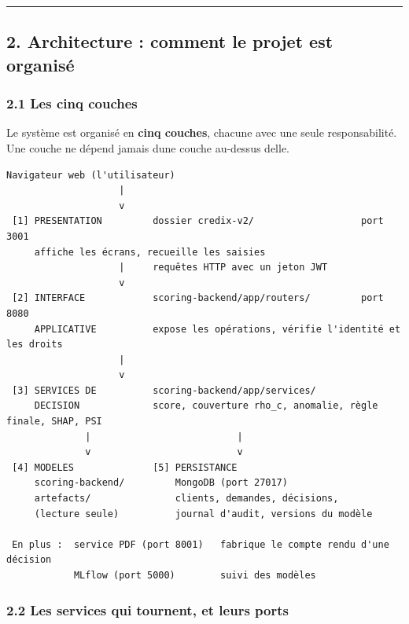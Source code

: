 \documentclass[
  french,
  11pt,
  a4paper,
]{article}
\begin{document}
\begin{center}\rule{0.5\linewidth}{0.5pt}\end{center}

\subsection{2. Architecture : comment le projet est
organisé}\label{2-architecture--comment-le-projet-est-organisuxe9}

\subsubsection{2.1 Les cinq couches}\label{21-les-cinq-couches}

Le système est organisé en \textbf{cinq couches}, chacune avec une seule
responsabilité. Une couche ne dépend jamais d\textquotesingle une couche
au-dessus d\textquotesingle elle.

\begin{Verbatim}[breaklines=true,breakanywhere=true,fontsize=\small,frame=leftline,framerule=1.6pt,rulecolor=\color{credixblue},framesep=3mm,xleftmargin=2mm,xrightmargin=1mm]
        Navigateur web (l'utilisateur)
                    |
                    v
 [1] PRESENTATION         dossier credix-v2/                   port 3001
     affiche les écrans, recueille les saisies
                    |     requêtes HTTP avec un jeton JWT
                    v
 [2] INTERFACE            scoring-backend/app/routers/         port 8080
     APPLICATIVE          expose les opérations, vérifie l'identité et les droits
                    |
                    v
 [3] SERVICES DE          scoring-backend/app/services/
     DECISION             score, couverture rho_c, anomalie, règle finale, SHAP, PSI
              |                          |
              v                          v
 [4] MODELES              [5] PERSISTANCE
     scoring-backend/         MongoDB (port 27017)
     artefacts/               clients, demandes, décisions,
     (lecture seule)          journal d'audit, versions du modèle

 En plus :  service PDF (port 8001)   fabrique le compte rendu d'une décision
            MLflow (port 5000)        suivi des modèles
\end{Verbatim}

\subsubsection{2.2 Les services qui tournent, et leurs
ports}\label{22-les-services-qui-tournent-et-leurs-ports}
\end{document}
